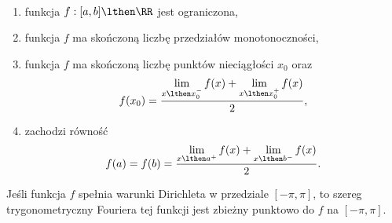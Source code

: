 \begin{definition} ~
    \begin{enumerate}
        \item funkcja $f : [a, b] \lthen \RR$ jest ograniczona,
        \item funkcja $f$ ma skończoną liczbę przedziałów monotonoczności,
        \item funkcja $f$ ma skończoną liczbę punktów nieciągłości $x_0$ oraz
        \[ f(x_0) = \frac{\lim\limits_{x\lthen x_0^-}f(x) + \lim\limits_{x\lthen x_0^+}f(x)}{2}, \]
        \item zachodzi równość
        \[ f(a) = f(b) = \frac{\lim\limits_{x\lthen a^+}f(x) + \lim\limits_{x\lthen b^-}f(x)}{2}. \]
    \end{enumerate}
\end{definition}

\begin{theorem}
    Jeśli funkcja $f$ spełnia warunki Dirichleta w przedziale $[-\pi, \pi]$, to szereg trygonometryczny Fouriera tej funkcji jest zbieżny punktowo do $f$ na $[-\pi, \pi]$.
\end{theorem}